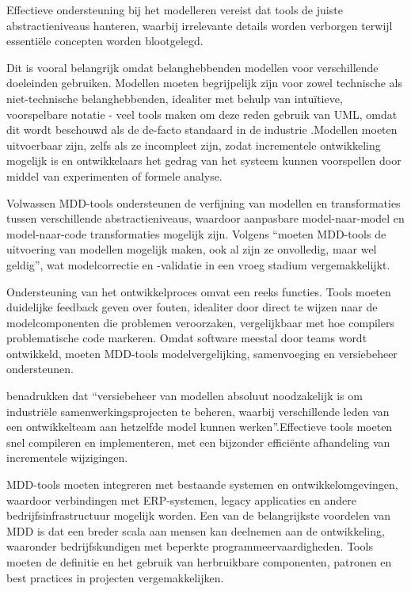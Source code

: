 Effectieve ondersteuning bij het modelleren vereist dat tools de juiste abstractieniveaus hanteren, waarbij irrelevante details worden verborgen terwijl essentiële concepten worden blootgelegd. 

Dit is vooral belangrijk omdat belanghebbenden modellen voor verschillende doeleinden gebruiken. Modellen moeten begrijpelijk zijn voor zowel technische als niet-technische belanghebbenden, idealiter met behulp van intuïtieve, voorspelbare notatie - veel tools maken om deze reden gebruik van UML, omdat dit wordt beschouwd als de de-facto standaard in de industrie \autocite{Marin2015} .Modellen moeten uitvoerbaar zijn, zelfs als ze incompleet zijn, zodat incrementele ontwikkeling mogelijk is en ontwikkelaars het gedrag van het systeem kunnen voorspellen door middel van experimenten of formele analyse. 

Volwassen MDD-tools ondersteunen de verfijning van modellen en transformaties tussen verschillende abstractieniveaus, waardoor aanpasbare model-naar-model en model-naar-code transformaties mogelijk zijn. Volgens \textcite{Marin2015} “moeten MDD-tools de uitvoering van modellen mogelijk maken, ook al zijn ze onvolledig, maar wel geldig”, wat modelcorrectie en -validatie in een vroeg stadium vergemakkelijkt.

Ondersteuning van het ontwikkelproces omvat een reeks functies. Tools moeten duidelijke feedback geven over fouten, idealiter door direct te wijzen naar de modelcomponenten die problemen veroorzaken, vergelijkbaar met hoe compilers problematische code markeren. 
Omdat software meestal door teams wordt ontwikkeld, moeten MDD-tools modelvergelijking, samenvoeging en versiebeheer ondersteunen. 

\textcite{Marin2015} benadrukken dat “versiebeheer van modellen absoluut noodzakelijk is om industriële samenwerkingsprojecten te beheren, waarbij verschillende leden van een ontwikkelteam aan hetzelfde model kunnen werken”.Effectieve tools moeten snel compileren en implementeren, met een bijzonder efficiënte afhandeling van incrementele wijzigingen.


MDD-tools moeten integreren met bestaande systemen en ontwikkelomgevingen, waardoor verbindingen met ERP-systemen, legacy applicaties en andere bedrijfsinfrastructuur mogelijk worden. Een van de belangrijkste voordelen van MDD is dat een breder scala aan mensen kan deelnemen aan de ontwikkeling, waaronder bedrijfskundigen met beperkte programmeervaardigheden. Tools moeten de definitie en het gebruik van herbruikbare componenten, patronen en best practices in projecten vergemakkelijken. 

